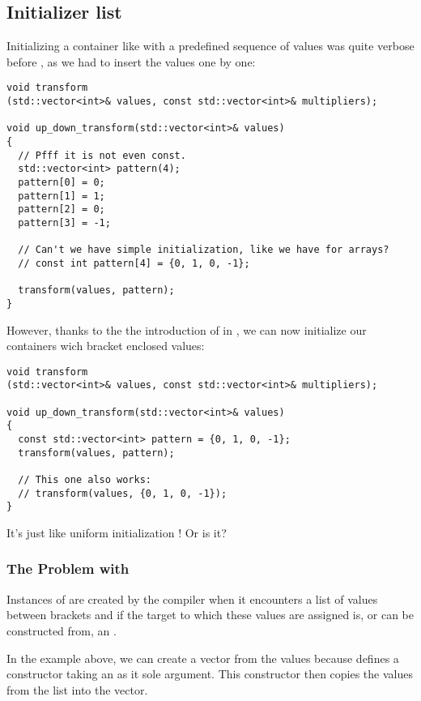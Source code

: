 \subsection{Initializer list}
\label{initializer-list}

Initializing a container like  with a predefined
sequence of values was quite verbose before , as we had to
insert the values one by one:

\begin{lstlisting}
void transform
(std::vector<int>& values, const std::vector<int>& multipliers);

void up_down_transform(std::vector<int>& values)
{
  // Pfff it is not even const.
  std::vector<int> pattern(4);
  pattern[0] = 0;
  pattern[1] = 1;
  pattern[2] = 0;
  pattern[3] = -1;

  // Can't we have simple initialization, like we have for arrays?
  // const int pattern[4] = {0, 1, 0, -1};

  transform(values, pattern);
}
\end{lstlisting}

However, thanks to the the introduction of
 in , we can now initialize our
containers wich bracket enclosed values:

\begin{lstlisting}
void transform
(std::vector<int>& values, const std::vector<int>& multipliers);

void up_down_transform(std::vector<int>& values)
{
  const std::vector<int> pattern = {0, 1, 0, -1};
  transform(values, pattern);

  // This one also works:
  // transform(values, {0, 1, 0, -1});
}
\end{lstlisting}

It's just like uniform initialization !
Or is it?

\subsubsection{The Problem with }

Instances of  are created by the compiler
when it encounters a list of values between brackets and if the target
to which these values are assigned is, or can be constructed from, an
.

In the example above, we can create a vector from the values because
 defines a constructor taking an
 as it sole argument. This constructor
then copies the values from the list into the vector.

